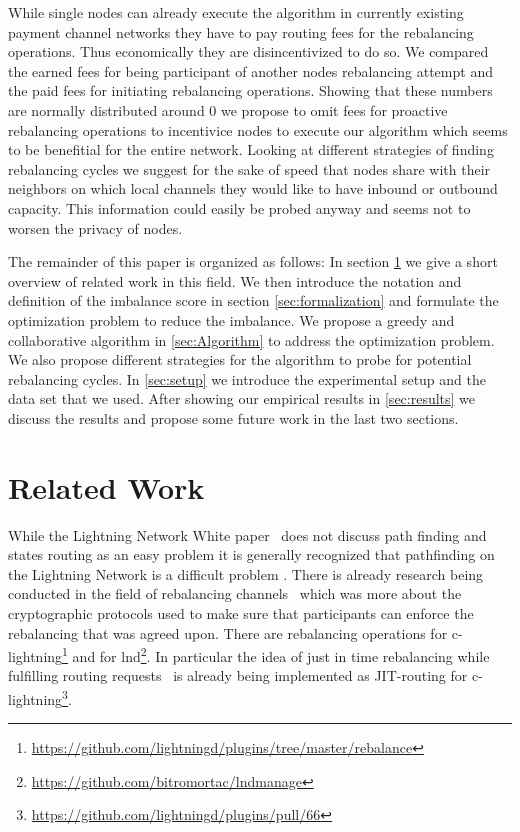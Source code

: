 \documentclass[a4paper]{paper}
\begin{document}
While single nodes can already execute the algorithm in currently existing payment channel networks they have to pay routing fees for the rebalancing operations.
Thus economically they are disincentivized to do so.
We compared the earned fees for being participant of another nodes rebalancing attempt and the paid fees for initiating rebalancing operations.
Showing that these numbers are normally distributed around $0$ we propose to omit fees for proactive rebalancing operations to incentivice nodes to execute our algorithm which seems to be benefitial for the entire network. 
Looking at different strategies of finding rebalancing cycles we suggest for the sake of speed that nodes share with their neighbors on which local channels they would like to have inbound or outbound capacity.
This information could easily be probed anyway and seems not to worsen the privacy of nodes.

The remainder of this paper is organized as follows: In section \cref{sec:relatedWork} we give a short overview of related work in this field.
We then introduce the notation and definition of the imbalance score in section \cref{sec:formalization} and formulate the optimization problem to reduce the imbalance.
We propose a greedy and collaborative algorithm in \ref{sec:Algorithm} to address the optimization problem.
We also propose different strategies for the algorithm to probe for potential rebalancing cycles.
In \cref{sec:setup} we introduce the experimental setup and the data set that we used.
After showing our empirical results in \cref{sec:results} we discuss the results and propose some future work in the last two sections.



\section{Related Work}
\label{sec:relatedWork}

While the Lightning Network White paper~\cite{poon2016bitcoin} does not discuss path finding and states routing as an easy problem it is generally recognized that pathfinding on the Lightning Network is a difficult problem \cite{piatkivskyi2018split, prihodko2016flare, bagaria2019boomerang, pickhardt2019pathfinding, grunspan2018ant, sivaraman2018routing}.
There is already research being conducted in the field of rebalancing channels~\cite{khalil2017revive} which was more about the cryptographic protocols used to make sure that participants can enforce the rebalancing that was agreed upon.
There are rebalancing operations for c-lightning\footnote{\url{https://github.com/lightningd/plugins/tree/master/rebalance}} and for lnd\footnote{\url{https://github.com/bitromortac/lndmanage}}.
In particular the idea of just in time rebalancing while fulfilling routing requests~\cite{pickhardt2019jit} is already being implemented as JIT-routing for c-lightning\footnote{\url{https://github.com/lightningd/plugins/pull/66}}. 
\end{document}
